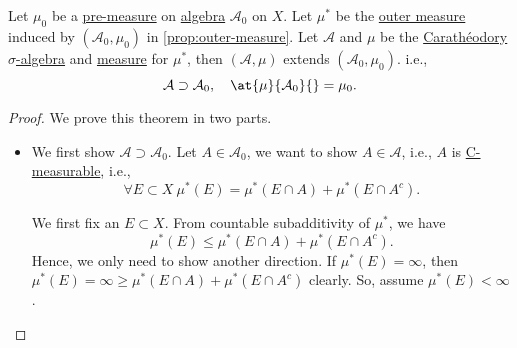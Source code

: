\begin{theorem}\label{thm:Hahn-Kolmogorov-Thm}
	Let \(\mu_0\) be a \hyperref[def:pre-measure]{pre-measure} on \hyperref[def:algebra]{algebra} \(\mathcal{A} _0\) on \(X\).
	Let \(\mu^{*} \) be the \hyperref[def:outer-measure]{outer measure} induced by \((\mathcal{A} _0, \mu_0)\) in \autoref{prop:outer-measure}.
	Let \(\mathcal{A}\) and \(\mu\) be the \hyperref[thm:Caratheodory-extension-Thm]{Carathéodory \(\sigma\)-algebra} and \hyperref[def:measure]{measure} for \(\mu^{*} \), then
	\((\mathcal{A} , \mu)\) extends \((\mathcal{A} _0, \mu_0)\). i.e.,
	\[
		\mathcal{A} \supset \mathcal{A} _0,\quad \at{\mu}{\mathcal{A}_0 }{} = \mu_0.
	\]
\end{theorem}
\begin{proof}\let\qed\relax
	We prove this theorem in two parts.
	\begin{itemize}
		\item We first show \(\mathcal{A} \supset \mathcal{A} _0\). Let \(A\in \mathcal{A} _0\), we want to show \(A\in \mathcal{A} \), i.e.,
		      \(A\) is \hyperref[def:C-measurable]{C-measurable}, i.e.,
		      \[
			      \forall E\subset X\ \mu^{*} (E) = \mu^{*} (E\cap A) + \mu^{*} (E\cap A^{c}).
		      \]

		      \par We first fix an \(E\subset X\). From countable subadditivity of \(\mu^{*} \), we have
		      \[
			      \mu^{*} (E) \leq \mu^{*} (E\cap A) + \mu^{*} (E\cap A^{c} ).
		      \]
		      Hence, we only need to show another direction. If \(\mu^{*} (E) = \infty \), then \(\mu^{*} (E) = \infty \geq \mu^{*} (E\cap A) + \mu^{*} (E\cap A^{c} )\) clearly.
		      So, assume \(\mu^{*} (E)<\infty \).


\end{itemize}
\end{proof}
